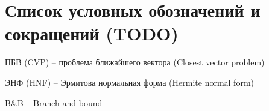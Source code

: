 \newpage

\section{Список условных обозначений и сокращений (TODO)}

ПБВ (CVP) -- проблема ближайшего вектора (Closest vector problem)

ЭНФ (HNF) -- Эрмитова нормальная форма (Hermite normal form)

B\&B -- Branch and bound

\clearpage